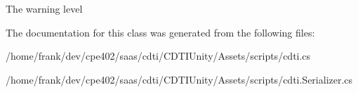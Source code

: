 The warning level



The documentation for this class was generated from the following files\+:\begin{DoxyCompactItemize}
\item 
/home/frank/dev/cpe402/saas/cdti/\+C\+D\+T\+I\+Unity/\+Assets/scripts/cdti.\+cs\item 
/home/frank/dev/cpe402/saas/cdti/\+C\+D\+T\+I\+Unity/\+Assets/scripts/cdti.\+Serializer.\+cs\end{DoxyCompactItemize}
